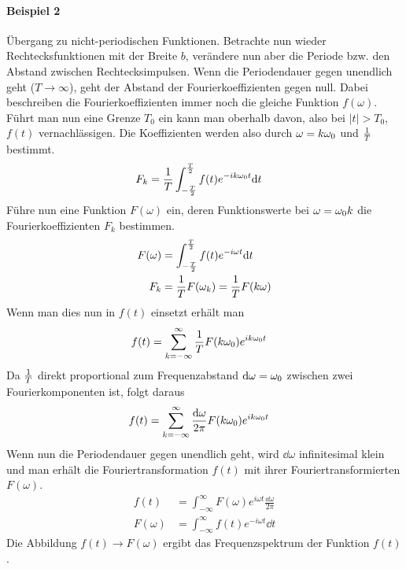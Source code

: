 \paragraph{Beispiel 2} Übergang zu nicht-periodischen
Funktionen. Betrachte nun wieder Rechtecksfunktionen mit der Breite $b$,
verändere nun aber die Periode bzw. den Abstand zwischen
Rechtecksimpulsen.
Wenn die Periodendauer gegen unendlich geht
($T\longrightarrow\infty$), geht der Abstand der Fourierkoeffizienten
gegen null. Dabei beschreiben die Fourierkoeffizienten immer noch die
gleiche Funktion $f(\omega)$. Führt man nun eine Grenze $T_0$ ein kann
man oberhalb davon, also bei $\vert t\vert >T_0$, $f(t)$
vernachlässigen. Die Koeffizienten werden also durch $\omega=k\omega_0$
und $\frac{1}{T}$ bestimmt. 
\begin{align*}
	F_k &= \frac{1}{T} \int_{-\frac{T}{2}}^{\frac{T}{2}} 
          f(t) e^{-ik\omega_0 t}\mathrm{d} t
\end{align*}
Führe nun eine Funktion $F(\omega)$ ein, deren Funktionswerte bei
$\omega=\omega_0 k$ die Fourierkoeffizienten $F_k$ bestimmen.
\begin{align*}
  F(\omega) &= \int_{-\frac{T}{2}}^{\frac{T}{2}}
              f(t)e^{-i\omega t}\mathrm{d} t\\
  F_k &= \frac{1}{T} F(\omega_k)        
=\frac{1}{T}F(k\omega)
\end{align*}
Wenn man dies nun in $f(t)$ einsetzt erhält man
\begin{align*}
  f(t) &= \sum_{k=-\infty}^{\infty}
         \frac{1}{T} F(k\omega_0)e^{ik\omega_0 t}
\end{align*}
Da $\frac{1}{T}$ direkt proportional zum Frequenzabstand 
$\mathrm{d}\omega=\omega_0$ zwischen zwei Fourierkomponenten ist, folgt daraus
\begin{align*}
	f(t) &= \sum_{k=-\infty}^{\infty}
           \frac{\mathrm{d} \omega}{2\pi} F(k\omega_0) e^{ik\omega_0 t}
\end{align*}
Wenn nun die Periodendauer gegen unendlich geht, 
wird $\dd \omega$ infinitesimal klein und man erhält die
Fouriertransformation $f(t)$ mit ihrer Fouriertransformierten
$F(\omega)$.
\begin{align*}
  f(t) &= \int_{-\infty}^{\infty} 
         F(\omega)e^{i\omega t}\frac{\dd\omega}{2\pi}\\
  F(\omega) &= \int_{-\infty}^{\infty} 
              f(t)e^{-i\omega t}\dd t
\end{align*}
Die Abbildung $f(t)\longrightarrow F(\omega)$ ergibt das
Frequenzspektrum der Funktion $f(t)$.

